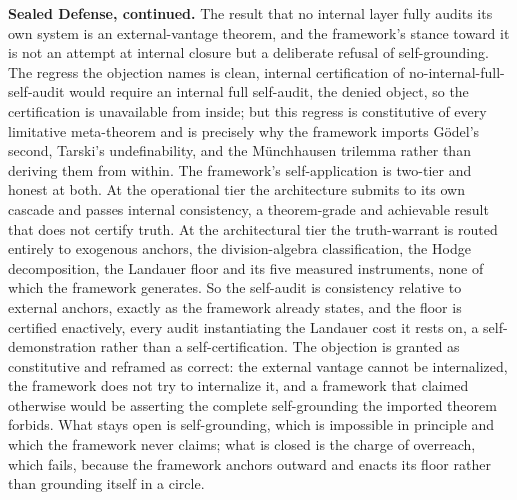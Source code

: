 \documentclass[10pt,twocolumn]{article}
\begin{document}
\textbf{Sealed Defense, continued.} The result that no internal layer
fully audits its own system is an external-vantage theorem, and the
framework's stance toward it is not an attempt at internal closure but a
deliberate refusal of self-grounding. The regress the objection names is
clean, internal certification of no-internal-full-self-audit would
require an internal full self-audit, the denied object, so the
certification is unavailable from inside; but this regress is
constitutive of every limitative meta-theorem and is precisely why the
framework imports Gödel's second, Tarski's undefinability, and the
Münchhausen trilemma rather than deriving them from within. The
framework's self-application is two-tier and honest at both. At the
operational tier the architecture submits to its own cascade and passes
internal consistency, a theorem-grade and achievable result that does
not certify truth. At the architectural tier the truth-warrant is routed
entirely to exogenous anchors, the division-algebra classification, the
Hodge decomposition, the Landauer floor and its five measured
instruments, none of which the framework generates. So the self-audit is
consistency relative to external anchors, exactly as the framework
already states, and the floor is certified enactively, every audit
instantiating the Landauer cost it rests on, a self-demonstration rather
than a self-certification. The objection is granted as constitutive and
reframed as correct: the external vantage cannot be internalized, the
framework does not try to internalize it, and a framework that claimed
otherwise would be asserting the complete self-grounding the imported
theorem forbids. What stays open is self-grounding, which is impossible
in principle and which the framework never claims; what is closed is the
charge of overreach, which fails, because the framework anchors outward
and enacts its floor rather than grounding itself in a circle.
\end{document}
